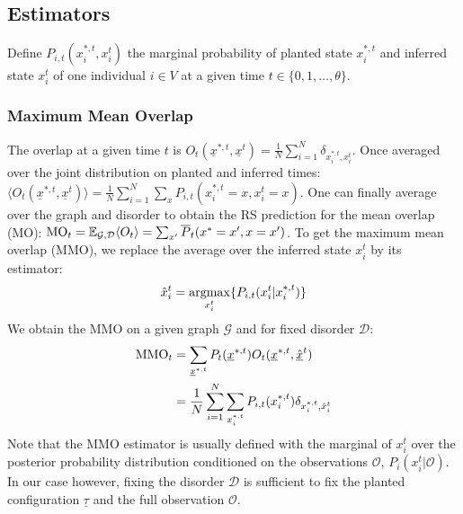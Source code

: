 \documentclass[a4paper, amsfonts, amssymb, amsmath, reprint, showkeys, nofootinbib, twoside, floatfix, pre,superscriptaddress, onecolumn]{revtex4-2}
\begin{document}
\subsection{Estimators}
Define $P_{i,t}(x_i^{*,t},x_i^t)$ the marginal probability of planted state $x_i^{*,t}$ and inferred state $x_i^t$ of one individual $i\in V$ at a given time $t\in\{0,1,\dots,\theta\}$.

\subsubsection{Maximum Mean Overlap}
The overlap at a given time $t$ is $O_t(\underline{x}^{*,t},\underline{x}^t) = \frac{1}{N}\sum_{i=1}^N\delta_{x_i^{*,t},x_i^t}$. Once averaged over the joint distribution on planted and inferred times: $\langle O_t(\underline{x}^{*,t},\underline{x}^t)\rangle = \frac{1}{N}\sum_{i=1}^N\sum_x P_{i,t}(x_i^{*,t}=x,x_i^t=x)$. One can finally average over the graph and disorder to obtain the RS prediction for the mean overlap (MO): ${\rm MO}_t = \mathbb{E}_{\mathcal{G},\mathcal{D}}\langle O_t\rangle =\sum_{x'}\overline{P}_t(x^*=x',x=x')$.
To get the maximum mean overlap (MMO), we replace the average over the inferred state $x_i^t$ by its estimator:
\begin{align}
	\hat{x}_i^t = \underset{x_i^t}{\rm argmax}\{P_{i,t}(x_i^t|x_i^{*,t})\}
\end{align}
We obtain the MMO on a given graph $\mathcal{G}$ and for fixed disorder $\mathcal{D}$:
\begin{align}
\begin{aligned}
	{\rm MMO}_t &= \sum_{\underline{x}^{*,t}}P_{t}(\underline{x}^{*,t})O_t(\underline{x}^{*,t},\underline{\hat{x}}^t) \\
	&=\frac{1}{N}\sum_{i=1}^N\sum_{x_i^{*,t}}P_{i,t}(x_i^{*,t})\delta_{x_i^{*,t},\hat{x}_i^t}
\end{aligned}
\end{align} 
Note that the MMO estimator is usually defined with the marginal of $x_i^t$ over the posterior probability distribution conditioned on the observations $\mathcal{O}$, $P_i(x_i^t|\mathcal{O})$. 
In our case however, fixing the disorder $\mathcal{D}$ is sufficient to fix the planted configuration $\underline{\tau}$ and the full observation $\mathcal{O}$. 
\end{document}
